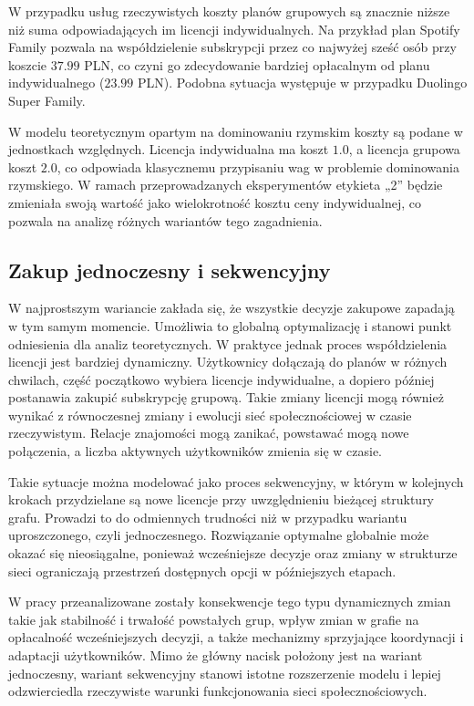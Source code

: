 W przypadku usług rzeczywistych koszty planów grupowych są znacznie niższe niż suma odpowiadających im licencji indywidualnych. Na przykład plan Spotify Family pozwala na współdzielenie subskrypcji przez co najwyżej sześć osób przy koszcie $37.99$ PLN, co czyni go zdecydowanie bardziej opłacalnym od planu indywidualnego ($23.99$ PLN). Podobna sytuacja występuje w przypadku Duolingo Super Family.

W modelu teoretycznym opartym na dominowaniu rzymskim koszty są podane w jednostkach względnych. Licencja indywidualna ma koszt $1.0$, a licencja grupowa koszt $2.0$, co odpowiada klasycznemu przypisaniu wag w problemie dominowania rzymskiego. W ramach przeprowadzanych eksperymentów etykieta „2” będzie zmieniała swoją wartość jako wielokrotność kosztu ceny indywidualnej, co pozwala na analizę różnych wariantów tego zagadnienia.


\subsection{Zakup jednoczesny i sekwencyjny}

W najprostszym wariancie zakłada się, że wszystkie decyzje zakupowe zapadają w tym samym momencie. Umożliwia to globalną optymalizację i stanowi punkt odniesienia dla analiz teoretycznych. W praktyce jednak proces współdzielenia licencji jest bardziej dynamiczny. Użytkownicy dołączają do planów w różnych chwilach, część początkowo wybiera licencje indywidualne, a dopiero później postanawia zakupić subskrypcję grupową. Takie zmiany licencji mogą również wynikać z równoczesnej zmiany i ewolucji sieć społecznościowej w czasie rzeczywistym. Relacje znajomości mogą zanikać, powstawać mogą nowe połączenia, a liczba aktywnych użytkowników zmienia się w czasie.

Takie sytuacje można modelować jako proces sekwencyjny, w którym w kolejnych krokach przydzielane są nowe licencje przy uwzględnieniu bieżącej struktury grafu. Prowadzi to do odmiennych trudności niż w przypadku wariantu uproszczonego, czyli jednoczesnego. Rozwiązanie optymalne globalnie może okazać się nieosiągalne, ponieważ wcześniejsze decyzje oraz zmiany w strukturze sieci ograniczają przestrzeń dostępnych opcji w późniejszych etapach.

W pracy przeanalizowane zostały konsekwencje tego typu dynamicznych zmian takie jak stabilność i trwałość powstałych grup, wpływ zmian w grafie na opłacalność wcześniejszych decyzji, a także mechanizmy sprzyjające koordynacji i adaptacji użytkowników. Mimo że główny nacisk położony jest na wariant jednoczesny, wariant sekwencyjny stanowi istotne rozszerzenie modelu i lepiej odzwierciedla rzeczywiste warunki funkcjonowania sieci społecznościowych.
